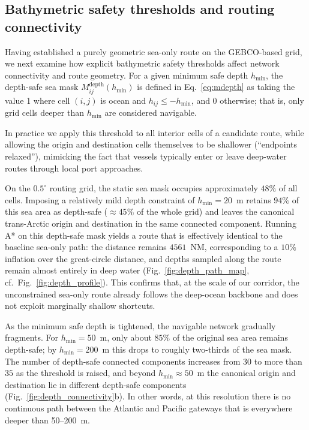 \subsection{Bathymetric safety thresholds and routing connectivity}
\label{sec:results_depth}

Having established a purely geometric sea-only route on the GEBCO-based grid,
we next examine how explicit bathymetric safety thresholds affect network
connectivity and route geometry. For a given minimum safe depth
\(h_\mathrm{min}\), the depth-safe sea mask \(M^\mathrm{depth}_{ij}(h_\mathrm{min})\) is
defined in Eq.~\eqref{eq:mdepth} as taking the value 1 where cell \((i,j)\) is
ocean and \(h_{ij} \le -h_\mathrm{min}\), and 0 otherwise; that is, only grid cells
deeper than \(h_\mathrm{min}\) are considered navigable.

In practice we apply this threshold to all interior cells of a candidate route,
while allowing the origin and destination cells themselves to be shallower
(``endpoints relaxed''), mimicking the fact that vessels typically enter or
leave deep-water routes through local port approaches.

On the $0.5^{\circ}$ routing grid, the static sea mask occupies
approximately $48\%$ of all cells. Imposing a relatively mild depth constraint
of $h_{\min}=20$~m retains $94\%$ of this sea area as depth-safe
($\approx 45\%$ of the whole grid) and leaves the canonical trans-Arctic
origin and destination in the same connected component. Running A* on this
depth-safe mask yields a route that is effectively identical to the baseline
sea-only path: the distance remains $4561$~NM, corresponding to a $10\%$
inflation over the great-circle distance, and depths sampled along the route
remain almost entirely in deep water
(Fig.~\ref{fig:depth_path_map}, cf.~Fig.~\ref{fig:depth_profile}). This confirms that, at the scale of our
corridor, the unconstrained sea-only route already follows the deep-ocean
backbone and does not exploit marginally shallow shortcuts.

As the minimum safe depth is tightened, the navigable network gradually
fragments. For $h_{\min}=50$~m, only about $85\%$ of the original sea area
remains depth-safe; by $h_{\min}=200$~m this drops to roughly two-thirds of the
sea mask. The number of depth-safe connected components increases from
$30$ to more than $35$ as the threshold is raised, and beyond
$h_{\min}\approx 50$~m the canonical origin and destination lie in different
depth-safe components (Fig.~\ref{fig:depth_connectivity}b). In other words, at
this resolution there is no continuous path between the Atlantic and Pacific
gateways that is everywhere deeper than 50--200~m.

